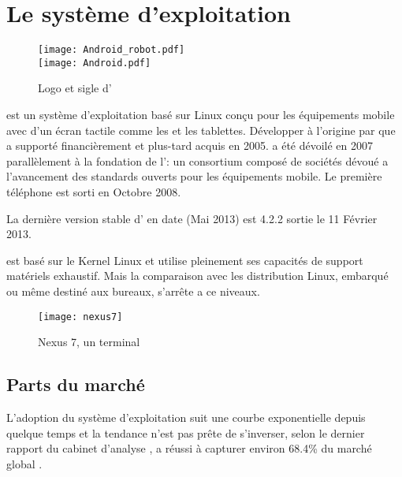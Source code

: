 \section{Le système d'exploitation \android{}}

\begin{figure}[H]
\begin{center}
\texttt{[image: Android\_robot.pdf]}\\
\texttt{[image: Android.pdf]}
\end{center}
\caption{Logo et sigle d'\android{}}
\end{figure}

\android{} est un système d'exploitation basé sur Linux conçu pour les
équipements mobile avec d'un écran tactile comme les  et
les tablettes. Développer à l'origine par  que
 a supporté financièrement et plus-tard acquis en 2005.
\android{} a été dévoilé en 2007 parallèlement à la fondation de
l': un consortium composé de sociétés dévoué a
l'avancement des standards ouverts pour les équipements mobile. Le
première téléphone  \android{} est sorti en Octobre 2008.

La dernière version stable d'\android{} en date (Mai 2013) est 4.2.2
 sortie le 11 Février 2013.

\android{} est basé sur le Kernel Linux et utilise pleinement ses capacités de support matériels exhaustif. Mais la comparaison avec les distribution Linux, embarqué ou même destiné aux bureaux, s'arrête a ce niveaux.~\cite{lft:growth_android}

\begin{figure}
\centering
\texttt{[image: nexus7]}
\caption{ Nexus 7, un terminal \android}
\end{figure}

\subsection{Parts du marché}

L’adoption du système d'exploitation \android{} suit une courbe
exponentielle depuis quelque temps et la tendance n'est pas prête de
s’inverser, selon le dernier rapport du cabinet d'analyse , \android{} a réussi à capturer environ 68.4\% du marché
global \cite{venturebeat.com}.

